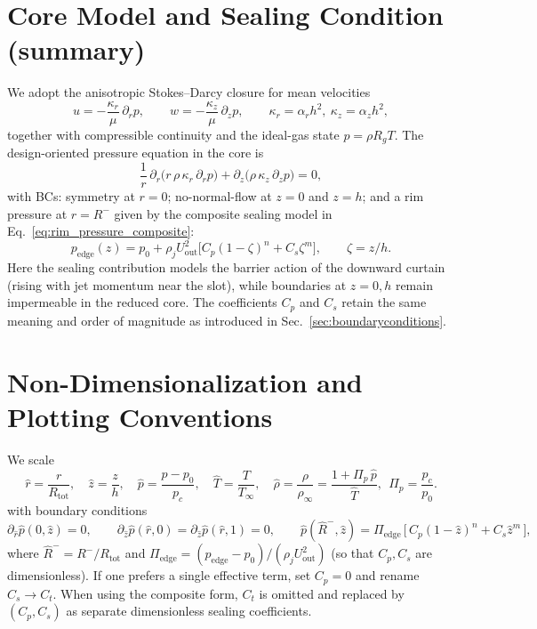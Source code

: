 \documentclass[11pt,a4paper]{article}
\begin{document}
\section{Core Model and Sealing Condition (summary)}
We adopt the anisotropic Stokes--Darcy closure for mean velocities
\begin{equation}
  u = -\frac{\kappa_r}{\mu}\,\partial_r p,\qquad
  w = -\frac{\kappa_z}{\mu}\,\partial_z p,\qquad
  \kappa_r=\alpha_r h^2,\ \kappa_z=\alpha_z h^2,
\end{equation}
together with compressible continuity and the ideal-gas state $p=\rho R_g T$.
The design-oriented pressure equation in the core is
\begin{equation}
  \frac{1}{r}\,\partial_r\!\big(r\,\rho\,\kappa_r\,\partial_r p\big)
  +\partial_z\!\big(\rho\,\kappa_z\,\partial_z p\big)=0,
\end{equation}
with BCs: symmetry at $r=0$; no-normal-flow at $z=0$ and $z=h$; and a rim pressure
at $r=R^{-}$ given by the composite sealing model in
Eq.~\eqref{eq:rim_pressure_composite}:
\begin{equation}
  p_{\mathrm{edge}}(z) = p_0 + \rho_j U_{\mathrm{out}}^2
  \big[ C_p(1-\zeta)^{n} + C_s \zeta^{m} \big], \qquad \zeta=z/h.
\end{equation}
Here the sealing contribution models the barrier action of the downward curtain
(rising with jet momentum near the slot), while boundaries at $z=0,h$ remain
impermeable in the reduced core. The coefficients $C_p$ and $C_s$ retain the same meaning and order of magnitude as
introduced in Sec.~\ref{sec:boundaryconditions}.



\section{Non-Dimensionalization and Plotting Conventions}
We scale
\begin{equation}
  \hat r=\frac{r}{R_{\mathrm{tot}}},\quad
  \hat z=\frac{z}{h},\quad
  \hat p=\frac{p-p_0}{p_c},\quad
  \hat T=\frac{T}{T_\infty},\quad
  \hat\rho=\frac{\rho}{\rho_\infty}=\frac{1+\Pi_p\,\hat p}{\hat T},\ \ \Pi_p=\frac{p_c}{p_0}.
\end{equation}
with boundary conditions
\begin{equation}
  \partial_{\hat r}\hat p(0,\hat z)=0,\qquad
  \partial_{\hat z}\hat p(\hat r,0)=\partial_{\hat z}\hat p(\hat r,1)=0,\qquad
  \hat p(\hat R^{-},\hat z)=
  \Pi_{\mathrm{edge}}\,
  \big[\, C_p (1-\hat z)^{n} + C_s \hat z^{m} \,\big],
\end{equation}
where $\hat R^{-}=R^{-}/R_{\mathrm{tot}}$ and
$\Pi_{\mathrm{edge}}=(p_{\mathrm{edge}}-p_0)/(\rho_j U_{\mathrm{out}}^2)$ (so that
$C_p,C_s$ are dimensionless). If one prefers a single effective term,
set $C_p=0$ and rename $C_s\to C_t$. When using the composite form, $C_t$ is omitted and replaced by $(C_p,C_s)$ as separate
dimensionless sealing coefficients.
\end{document}
